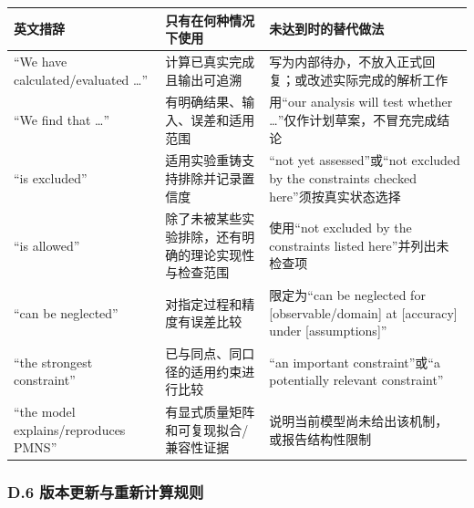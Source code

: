 \documentclass[
  chinese,
  UTF8]{ctexart}
\newcounter{none} %
\begin{document}
{\def\LTcaptype{none} %
\begin{longtable}[]{@{}
  >{\raggedright\arraybackslash}p{}
  >{\raggedright\arraybackslash}p{}
  >{\raggedright\arraybackslash}p{}@{}}
\toprule\noalign{}
\begin{minipage}[b]{\linewidth}\raggedright
英文措辞
\end{minipage} & \begin{minipage}[b]{\linewidth}\raggedright
只有在何种情况下使用
\end{minipage} & \begin{minipage}[b]{\linewidth}\raggedright
未达到时的替代做法
\end{minipage} \\
\midrule\noalign{}
\endhead
\bottomrule\noalign{}
\endlastfoot
``We have calculated/evaluated \ldots'' & 计算已真实完成且输出可追溯 &
写为内部待办，不放入正式回复；或改述实际完成的解析工作 \\
``We find that \ldots'' & 有明确结果、输入、误差和适用范围 & 用``our
analysis will test whether \ldots''仅作计划草案，不冒充完成结论 \\
``is excluded'' & 适用实验重铸支持排除并记录置信度 & ``not yet
assessed''或``not excluded by the constraints checked
here''须按真实状态选择 \\
``is allowed'' & 除了未被某些实验排除，还有明确的理论实现性与检查范围 &
使用``not excluded by the constraints listed here''并列出未检查项 \\
``can be neglected'' & 对指定过程和精度有误差比较 & 限定为``can be
neglected for {[}observable/domain{]} at {[}accuracy{]} under
{[}assumptions{]}'' \\
``the strongest constraint'' & 已与同点、同口径的适用约束进行比较 & ``an
important constraint''或``a potentially relevant constraint'' \\
``the model explains/reproduces PMNS'' &
有显式质量矩阵和可复现拟合/兼容性证据 &
说明当前模型尚未给出该机制，或报告结构性限制 \\
\end{longtable}
}

\subsubsection{D.6
版本更新与重新计算规则}\label{d.6-ux7248ux672cux66f4ux65b0ux4e0eux91cdux65b0ux8ba1ux7b97ux89c4ux5219}
\end{document}
